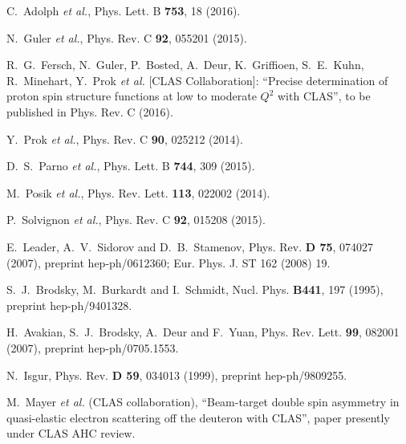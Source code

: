 \documentclass[12pt]{report}
\begin{document}
\begin{thebibliography}{99}
C.~Adolph {\it et al.}, %
Phys. Lett. B {\bf 753}, 18 (2016).

N.~Guler {\it et al.}, %
Phys. Rev. C {\bf 92}, 055201 (2015).

R.~G.~Fersch, N.~Guler, P.~Bosted, A.~Deur, K.~Griffioen, S.~E.~Kuhn,
R.~Minehart, Y.~Prok {\it et al.} [CLAS Collaboration]:
``Precise determination of proton spin structure functions at
low to moderate $Q^2$ with CLAS'',
to be published in Phys. Rev. C (2016).

Y.~Prok {\it et al.},
Phys. Rev. C {\bf 90}, 025212 (2014).

D.~S.~Parno {\it et al.},
Phys. Lett. B {\bf 744}, 309 (2015).

M.~Posik {\it et al.},
Phys. Rev. Lett. {\bf 113}, 022002 (2014).

P.~Solvignon {\it et al.},
Phys. Rev. C {\bf 92}, 015208 (2015).

  E.~Leader, A.~V.~Sidorov and D.~B.~Stamenov,
Phys. Rev. {\bf D 75}, 074027 (2007), 
preprint hep-ph/0612360; Eur. Phys. J. ST 162 (2008) 19.

  S.~J.~Brodsky, M.~Burkardt and I.~Schmidt,
  Nucl. Phys. {\bf B441}, 197 (1995), 
  preprint hep-ph/9401328.

  H.~Avakian, S.~J.~Brodsky, A.~Deur and F.~Yuan,
  Phys. Rev. Lett. {\bf 99}, 082001 (2007), 
  preprint hep-ph/0705.1553.

  N.~Isgur,
  Phys. Rev. {\bf D 59}, 034013 (1999), 
 preprint hep-ph/9809255.

  M.~Mayer {\it et al.} (CLAS collaboration), 
  ``Beam-target double spin asymmetry in quasi-elastic electron scattering off the deuteron with CLAS'',
  paper presently under CLAS AHC review.

\end{thebibliography}
\end{document}
